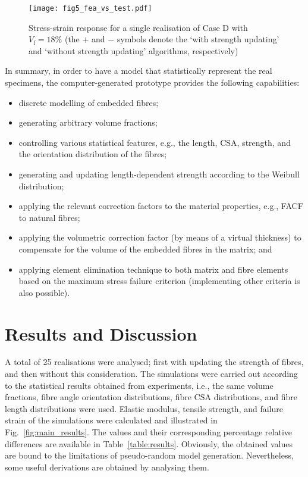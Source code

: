 	\begin{figure}[!t]
		\centering
		\texttt{[image: fig5\_fea\_vs\_test.pdf]}
		\caption{Stress-strain response for a single realisation of Case D with $V_\text{f}=18\%$ (the $+$ and $-$ symbols denote the `with strength updating' and `without strength updating' algorithms, respectively)}\label{fig:stressstrain}
	\end{figure}%
In summary, in order to have a model that statistically represent the real specimens, the computer-generated prototype provides the following capabilities:
\begin{itemize}
\item discrete modelling of embedded fibres;
\item generating arbitrary volume fractions;
\item controlling various statistical features, e.g., the length, CSA, strength, and the orientation distribution of the fibres;
\item generating and updating length-dependent strength according to the Weibull distribution; 
\item applying the relevant correction factors to the material properties, e.g., FACF to natural fibres; 
\item applying the volumetric correction factor (by means of a virtual thickness) to compensate for the volume of the embedded fibres in the matrix; and
\item applying element elimination technique to both matrix and fibre elements based on the maximum stress failure criterion (implementing other criteria is also possible).
\end{itemize}
	

\section{Results and Discussion}
	A total of 25 realisations were analysed; first with updating the strength of fibres, and then without this consideration. The simulations were carried out according to the statistical results obtained from experiments, i.e., the same volume fractions, fibre angle orientation distributions, fibre CSA distributions, and fibre length distributions were used. Elastic modulus, tensile strength, and failure strain of the simulations were calculated and illustrated in Fig.~\ref{fig:main_results}. The values and their corresponding percentage relative differences are available in Table~\ref{table:results}. Obviously, the obtained values are bound to the limitations of pseudo-random model generation. Nevertheless, some useful derivations are obtained by analysing them.

